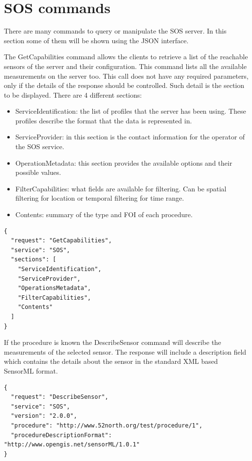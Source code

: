 \section{SOS commands}
There are many commands to query or manipulate the SOS server. In this section some of them will be shown using the JSON interface. 

The GetCapabilities command allows the clients to retrieve a list of the reachable sensors of the server and their configuration. This command lists all the available measurements on the server too. This call does not have any required parameters, only if the details of the response should be controlled. Such detail is the section to be displayed. There are 4 different sections:
\begin{itemize}
\item ServiceIdentification: the list of profiles that the server has been using. These profiles describe the format that the data is represented in.
\item ServiceProvider: in this section is the contact information for the operator of the SOS service.
\item OperationMetadata: this section provides the available options and their possible values.
\item FilterCapabilities: what fields are available for filtering. Can be spatial filtering for location or temporal filtering for time range.
\item Contents: summary of the type and FOI of each procedure. 
\end{itemize}

\begin{lstlisting}[caption={JSON getCapabilities POST request\label{lst:getcap}}]
{
  "request": "GetCapabilities",
  "service": "SOS",
  "sections": [
    "ServiceIdentification",
    "ServiceProvider",
    "OperationsMetadata",
    "FilterCapabilities",
    "Contents"
  ]
}
\end{lstlisting}

 If the procedure is known the DescribeSensor command will describe the measurements of the selected sensor. The response will include a description field which contains the details about the sensor in the standard XML based SensorML format. 

\begin{lstlisting}[caption={JSON DescribeSensor POST request\label{lst:descsens}}]
{
  "request": "DescribeSensor",
  "service": "SOS",
  "version": "2.0.0",
  "procedure": "http://www.52north.org/test/procedure/1",
  "procedureDescriptionFormat": "http://www.opengis.net/sensorML/1.0.1"
}
\end{lstlisting}

